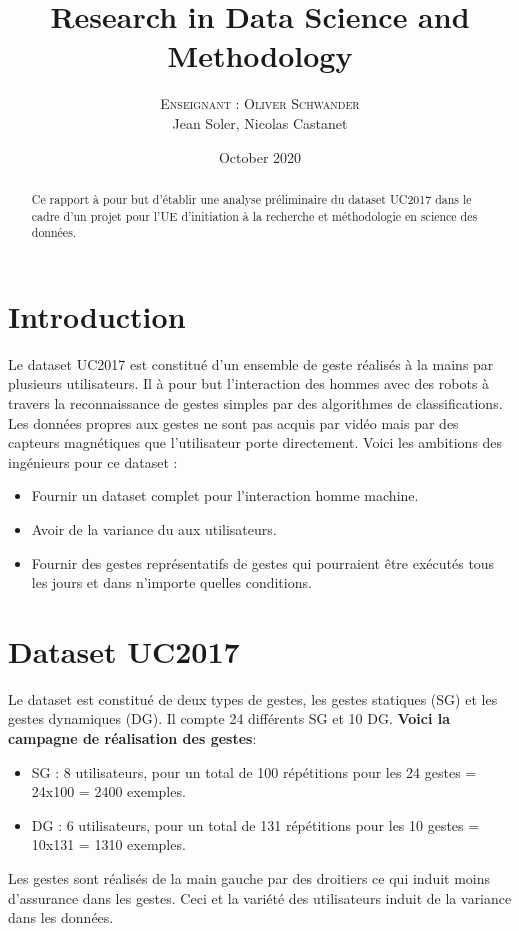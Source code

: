\documentclass[12pt,a4paper,roman]{article}
\title{Research in Data Science and Methodology}
\author{%
\textsc{Enseignant : Oliver Schwander} \\%
\textsc Jean Soler, Nicolas Castanet%
}
\date{October 2020}
\begin{document}
\maketitle
\begin{abstract}
Ce rapport à pour but d'établir une analyse préliminaire du dataset UC2017 dans le cadre d'un projet pour l'UE d'initiation à la recherche et méthodologie en science des données.
\end{abstract}
\section{Introduction}
Le dataset UC2017 est constitué d'un ensemble de geste réalisés à la mains par plusieurs utilisateurs. Il à pour but l'interaction des hommes avec des robots à travers la reconnaissance de gestes simples par des algorithmes de classifications. 
\newline
Les données propres aux gestes ne sont pas acquis par vidéo mais par des capteurs magnétiques que l'utilisateur porte directement.
Voici les ambitions des ingénieurs pour ce dataset :
\begin{itemize}
    \item Fournir un dataset complet pour l'interaction homme machine.
    \item Avoir de la variance du aux utilisateurs.
    \item Fournir des gestes représentatifs de gestes qui pourraient être exécutés tous les jours et dans n'importe quelles conditions.
\end{itemize}

\section{Dataset UC2017}
Le dataset est constitué de deux types de gestes, les gestes statiques (SG) et les gestes dynamiques (DG). Il compte 24 différents SG et 10 DG.
\newline
\textbf{Voici la campagne de réalisation des gestes}:
\begin{itemize}
    \item SG : 8 utilisateurs, pour un total de 100 répétitions pour les 24 gestes = 24x100 = 2400 exemples.
    \item DG : 6 utilisateurs, pour un total de 131 répétitions pour les 10 gestes = 10x131 = 1310 exemples.
\end{itemize}
Les gestes sont réalisés de la main gauche par des droitiers ce qui induit moins d'assurance dans les gestes. Ceci et la variété des utilisateurs induit de la variance dans les données.
\end{document}
